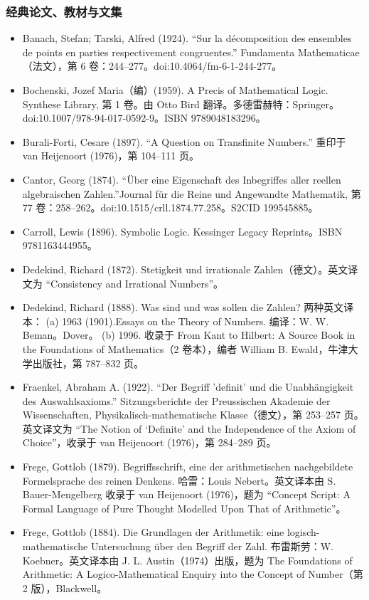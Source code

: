 \subsubsection{经典论文、教材与文集}
\begin{itemize}
  \item Banach, Stefan; Tarski, Alfred (1924). “Sur la décomposition des ensembles de points en parties respectivement congruentes.” Fundamenta Mathematicae（法文），第 6 卷：244–277。doi:10.4064/fm-6-1-244-277。
  \item Bochenski, Jozef Maria（编）(1959). A Precis of Mathematical Logic. Synthese Library, 第 1 卷。由 Otto Bird 翻译。多德雷赫特：Springer。doi:10.1007/978-94-017-0592-9。ISBN 9789048183296。
  \item Burali-Forti, Cesare (1897). “A Question on Transfinite Numbers.” 重印于 van Heijenoort (1976)，第 104–111 页。
  \item Cantor, Georg (1874). “Über eine Eigenschaft des Inbegriffes aller reellen algebraischen Zahlen.”Journal für die Reine und Angewandte Mathematik, 第 77 卷：258–262。doi:10.1515/crll.1874.77.258。S2CID 199545885。
  \item Carroll, Lewis (1896). Symbolic Logic. Kessinger Legacy Reprints。ISBN 9781163444955。
  \item Dedekind, Richard (1872). Stetigkeit und irrationale Zahlen（德文）。英文译文为 “Consistency and Irrational Numbers”。
  \item Dedekind, Richard (1888). Was sind und was sollen die Zahlen?  
        两种英文译本：  
        (a) 1963 (1901).Essays on the Theory of Numbers. 编译：W. W. Beman。Dover。  
        (b) 1996. 收录于 From Kant to Hilbert: A Source Book in the Foundations of Mathematics（2 卷本），编者 William B. Ewald，牛津大学出版社，第 787–832 页。
  \item Fraenkel, Abraham A. (1922). “Der Begriff 'definit' und die Unabhängigkeit des Auswahlsaxioms.” Sitzungsberichte der Preussischen Akademie der Wissenschaften, Physikalisch-mathematische Klasse（德文），第 253–257 页。英文译文为 “The Notion of ‘Definite’ and the Independence of the Axiom of Choice”，收录于 van Heijenoort (1976)，第 284–289 页。
  \item Frege, Gottlob (1879). Begriffsschrift, eine der arithmetischen nachgebildete Formelsprache des reinen Denkens. 哈雷：Louis Nebert。英文译本由 S. Bauer-Mengelberg 收录于 van Heijenoort (1976)，题为 “Concept Script: A Formal Language of Pure Thought Modelled Upon That of Arithmetic”。
  \item Frege, Gottlob (1884). Die Grundlagen der Arithmetik: eine logisch-mathematische Untersuchung über den Begriff der Zahl. 布雷斯劳：W. Koebner。英文译本由 J. L. Austin（1974）出版，题为 The Foundations of Arithmetic: A Logico-Mathematical Enquiry into the Concept of Number（第 2 版），Blackwell。

\end{itemize}
